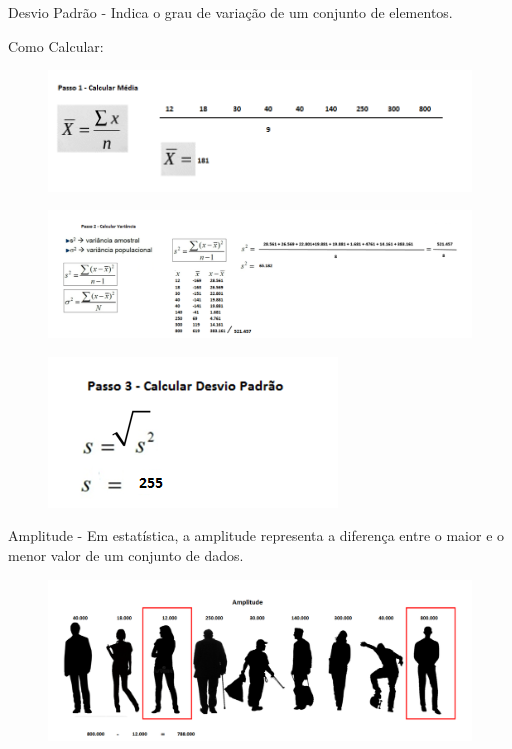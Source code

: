 Desvio Padrão - Indica o grau de variação de um conjunto de elementos.

Como Calcular:
 
	\begin{figure}[h!]
	\includegraphics[scale=0.50]{cap2/MedidasCentralidadeVariabilidade/DesvioPadrao1.png}
	\end{figure}

	\begin{figure}[h!]
    \includegraphics[scale=0.50]{cap2/MedidasCentralidadeVariabilidade/DesvioPadrao2.png}
	\end{figure}

	\begin{figure}[h!]
    \includegraphics[scale=0.50]{cap2/MedidasCentralidadeVariabilidade/DesvioPadrao3.png}
  	\end{figure}
  
\newpage
Amplitude - Em estatística, a amplitude representa a diferença entre o maior e o menor valor de um conjunto de dados.

	\begin{figure}[h!]
	\includegraphics[scale=0.50]{cap2/MedidasCentralidadeVariabilidade/Amplitude.png}
	\end{figure}


